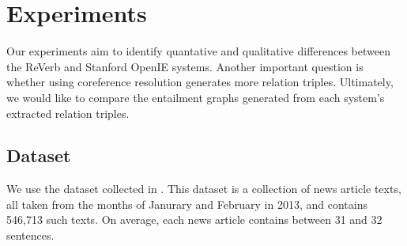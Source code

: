 \section{Experiments}

Our experiments aim to identify quantative and qualitative differences
between the ReVerb and Stanford OpenIE systems. Another important question
is whether using coreference resolution generates more relation triples. 
Ultimately, we would like to compare the entailment graphs generated from
each system's extracted relation triples. 

\subsection{Dataset}
We use the \newsspike{} dataset collected in \citet{zhang2013parallelparaphrase}.
This dataset is a collection of news article texts, all taken from the months of
Janurary and February in 2013, and contains 546,713 such texts. On average,
each news article contains between 31 and 32 sentences.

